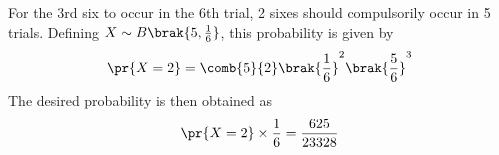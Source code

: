 For the 3rd six to occur in the 6th trial, 2 sixes should compulsorily occur in 5 trials.  Defining $X \sim B\brak{5,\frac{1}{6}}$, this probability is given by
\begin{align}
\pr{X = 2} = \comb{5}{2}\brak{\frac{1}{6}}^2\brak{\frac{5}{6}}^3
\end{align}
%
The desired probability is then obtained as
\begin{align}
    \pr{X=2}\times\frac{1}{6} = \frac{625}{23328} 
\end{align}
